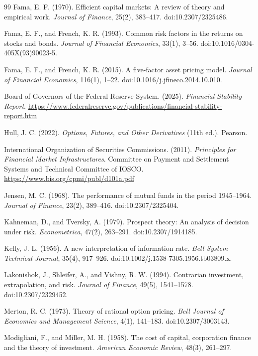 \documentclass[11pt,oneside,openany]{book}
\begin{document}
\begin{thebibliography}{99}
Fama, E. F. (1970). Efficient capital markets: A review of theory and empirical work. \textit{Journal of Finance}, 25(2), 383--417. doi:10.2307/2325486.

Fama, E. F., and French, K. R. (1993). Common risk factors in the returns on stocks and bonds. \textit{Journal of Financial Economics}, 33(1), 3--56. doi:10.1016/0304-405X(93)90023-5.

Fama, E. F., and French, K. R. (2015). A five-factor asset pricing model. \textit{Journal of Financial Economics}, 116(1), 1--22. doi:10.1016/j.jfineco.2014.10.010.

Board of Governors of the Federal Reserve System. (2025). \textit{Financial Stability Report}. \url{https://www.federalreserve.gov/publications/financial-stability-report.htm}

Hull, J. C. (2022). \textit{Options, Futures, and Other Derivatives} (11th ed.). Pearson.

International Organization of Securities Commissions. (2011). \textit{Principles for Financial Market Infrastructures}. Committee on Payment and Settlement Systems and Technical Committee of IOSCO. \url{https://www.bis.org/cpmi/publ/d101a.pdf}

Jensen, M. C. (1968). The performance of mutual funds in the period 1945--1964. \textit{Journal of Finance}, 23(2), 389--416. doi:10.2307/2325404.

Kahneman, D., and Tversky, A. (1979). Prospect theory: An analysis of decision under risk. \textit{Econometrica}, 47(2), 263--291. doi:10.2307/1914185.

Kelly, J. L. (1956). A new interpretation of information rate. \textit{Bell System Technical Journal}, 35(4), 917--926. doi:10.1002/j.1538-7305.1956.tb03809.x.

Lakonishok, J., Shleifer, A., and Vishny, R. W. (1994). Contrarian investment, extrapolation, and risk. \textit{Journal of Finance}, 49(5), 1541--1578. doi:10.2307/2329452.

Merton, R. C. (1973). Theory of rational option pricing. \textit{Bell Journal of Economics and Management Science}, 4(1), 141--183. doi:10.2307/3003143.

Modigliani, F., and Miller, M. H. (1958). The cost of capital, corporation finance and the theory of investment. \textit{American Economic Review}, 48(3), 261--297.


\end{thebibliography}
\end{document}
